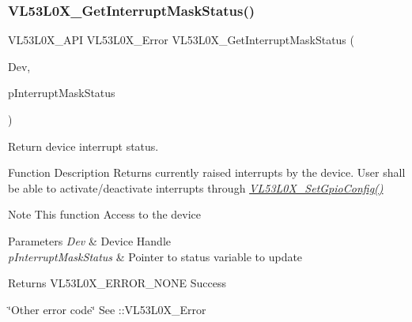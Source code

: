 \subsubsection{\texorpdfstring{V\+L53\+L0\+X\+\_\+\+Get\+Interrupt\+Mask\+Status()}{VL53L0X\_GetInterruptMaskStatus()}}
{\footnotesize\ttfamily V\+L53\+L0\+X\+\_\+\+A\+PI V\+L53\+L0\+X\+\_\+\+Error V\+L53\+L0\+X\+\_\+\+Get\+Interrupt\+Mask\+Status (\begin{DoxyParamCaption}\item[{\hyperlink{group__VL53L0X__platform__group_ga2d6405308b1dd524b462f1b8fb97d167}{V\+L53\+L0\+X\+\_\+\+D\+EV}}]{Dev,  }\item[{\hyperlink{vl53l0x__types_8h_a435d1572bf3f880d55459d9805097f62}{uint32\+\_\+t} $\ast$}]{p\+Interrupt\+Mask\+Status }\end{DoxyParamCaption})}



Return device interrupt status. 

\begin{DoxyParagraph}{Function Description}
Returns currently raised interrupts by the device. User shall be able to activate/deactivate interrupts through {\itshape \hyperlink{group__VL53L0X__interrupt__group_ga8793fb3c70a2c297247a103e1b446f49}{V\+L53\+L0\+X\+\_\+\+Set\+Gpio\+Config()}} 
\end{DoxyParagraph}
\begin{DoxyNote}{Note}
This function Access to the device
\end{DoxyNote}

\begin{DoxyParams}{Parameters}
{\em Dev} & Device Handle \\
\hline
{\em p\+Interrupt\+Mask\+Status} & Pointer to status variable to update \\
\hline
\end{DoxyParams}
\begin{DoxyReturn}{Returns}
V\+L53\+L0\+X\+\_\+\+E\+R\+R\+O\+R\+\_\+\+N\+O\+NE Success 

\char`\"{}\+Other error code\char`\"{} See \+::\+V\+L53\+L0\+X\+\_\+\+Error 
\end{DoxyReturn}
\mbox{\label{group__VL53L0X__interrupt__group_ga9d1025202afa35f30ec8efc1ab42b65d}} 
